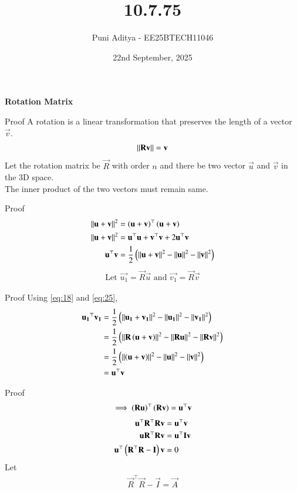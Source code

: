 \documentclass{beamer}
\title{10.7.75}
\date{22nd September, 2025}
\author{Puni Aditya - EE25BTECH11046}
\begin{document}
\frame{\titlepage}
\begin{frame}
\centering
	\textbf{Rotation Matrix}
\end{frame}

\begin{frame}{Proof}
A rotation is a linear transformation that preserves the length of a vector $\vec{v}$.
\begin{align}
    \left\lVert\mathbf{R}\mathbf{v}\right\rVert = \mathbf{v} \label{eq:18}
\end{align}
Let the rotation matrix be $\vec{R}$ with order $n$ and there be two vector $\vec{u}$ and $\vec{v}$ in the 3D space. \\
The inner product of the two vectors must remain same.
\end{frame}

\begin{frame}{Proof}
\begin{align}
    \left\lVert\mathbf{u}+\mathbf{v}\right\rVert^2 &= \left(\mathbf{u}+\mathbf{v}\right)^\top\left(\mathbf{u}+\mathbf{v}\right) \\
    \left\lVert\mathbf{u}+\mathbf{v}\right\rVert^2 &= \mathbf{u}^\top\mathbf{u}+\mathbf{v}^\top\mathbf{v} + 2\mathbf{u}^\top\mathbf{v} \\
    \mathbf{u}^\top\mathbf{v} &= \frac{1}{2}\left(\left\lVert\mathbf{u}+\mathbf{v}\right\rVert^2 - \left\lVert\mathbf{u}\right\rVert^2 - \left\lVert\mathbf{v}\right\rVert^2\right) \label{eq:25}
\end{align}
\begin{align}
    \text{Let }\vec{u_1} = \vec{R}\vec{u}\text{ and }\vec{v_1} = \vec{R}\vec{v}
\end{align}
\end{frame}

\begin{frame}{Proof}
Using \eqref{eq:18} and \eqref{eq:25}, 
\begin{align}
    \mathbf{u_1}^\top\mathbf{v_1} &= \frac{1}{2}\left(\left\lVert\mathbf{u_1}+\mathbf{v_1}\right\rVert^2 - \left\lVert\mathbf{u_1}\right\rVert^2 - \left\lVert\mathbf{v_1}\right\rVert^2\right) \\
    &= \frac{1}{2}\left(\left\lVert\mathbf{R}\left(\mathbf{u}+\mathbf{v}\right)\right\rVert^2 - \left\lVert\mathbf{R}\mathbf{u}\right\rVert^2 - \left\lVert\mathbf{R}\mathbf{v}\right\rVert^2\right) \\
    &= \frac{1}{2}\left(\left\lVert\left(\mathbf{u}+\mathbf{v}\right)\right\rVert^2 - \left\lVert\mathbf{u}\right\rVert^2 - \left\lVert\mathbf{v}\right\rVert^2\right) \\
    &= \mathbf{u}^\top\mathbf{v}
\end{align}
\end{frame}

\begin{frame}{Proof}
\begin{align} 
    \implies \left(\mathbf{R}\mathbf{u}\right)^\top \left(\mathbf{R}\mathbf{v}\right) = \mathbf{u}^\top \mathbf{v}
\end{align}
\begin{align}
    \mathbf{u}^\top\mathbf{R}^\top\mathbf{R}\mathbf{v} &= \mathbf{u}^\top \mathbf{v} \\
    \mathbf{u}\mathbf{R}^\top\mathbf{R}\mathbf{v} &= \mathbf{u}^\top\mathbf{I}\mathbf{v} \\
    \mathbf{u}^\top\left(\mathbf{R}^\top\mathbf{R}-\mathbf{I}\right)\mathbf{v} &= 0 \label{eq:43}
\end{align}
Let
\begin{align*}
    \vec{R}^\top\vec{R}-\vec{I} = \vec{A}
\end{align*}
\end{frame}
\end{document}
